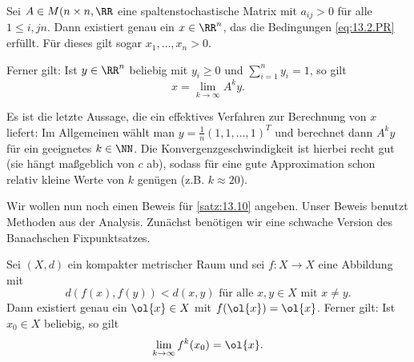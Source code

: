 \begin{satz}
	\label{satz:13.10}
	Sei $A \in M(n \times n, \RR$ eine spaltenstochastische Matrix mit $a_{ij} > 0$ für alle $1 \leq i,j n$.
	Dann existiert genau ein $x \in \RR^n$, das die Bedingungen \eqref{eq:13.2.PR} erfüllt.
	Für dieses gilt sogar $x_1,\dots,x_n > 0$.
	
	Ferner gilt: Ist $y \in \RR^n$ beliebig mit $y_i \geq 0$ und $\sum_{i=1}^{n} y_i = 1$, so gilt
	\[
		x = \lim\limits_{k \rightarrow \infty} A^k y.
	\]
\end{satz}

\begin{bemerkung}
	\label{bem:13.11}
	Es ist die letzte Aussage, die ein effektives Verfahren zur Berechnung von $x$ liefert:
	Im Allgemeinen wählt man $y = \frac{1}{n} (1,1,\dots,1)^T$ und berechnet dann $A^ky$ für ein geeignetes $k \in \NN$.
	Die Konvergenzgeschwindigkeit ist hierbei recht gut (sie hängt maßgeblich von $c$ ab), sodass für eine gute Approximation schon relativ kleine Werte von $k$ genügen (z.B. $k \approx 20$).
\end{bemerkung}

Wir wollen nun noch einen Beweis für \autoref{satz:13.10} angeben.
Unser Beweis benutzt Methoden aus der Analysis.
Zunächst benötigen wir eine schwache Version des Banachschen Fixpunktsatzes.

\begin{satz}
	\label{satz:13.12}
	Sei $(X,d)$ ein kompakter metrischer Raum und sei $f \colon X \rightarrow X$ eine Abbildung mit
	\begin{equation}
		d(f(x),f(y)) < d(x,y) \text{ für alle } x,y \in X \text{ mit } x \neq y. \label{eq:13.12}
	\end{equation}
	Dann existiert genau ein $\ol{x} \in X$ mit $f(\ol{x}) = \ol{x}$.
	Ferner gilt: Ist $x_0 \in X$ beliebig, so gilt
	\[
		\lim\limits_{k \rightarrow \infty} f^k(x_0) = \ol{x}.
	\]
\end{satz}

